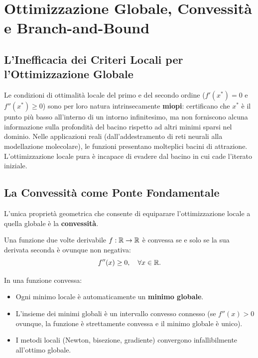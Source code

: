 \FloatBarrier
\section[Ottimizzazione Globale, Convessit\`a e Branch-and-Bound]{Ottimizzazione Globale, Convessit\`a\\e Branch-and-Bound}
\label{sec:univariata-global-branch-and-bound}

\subsection{L'Inefficacia dei Criteri Locali per l'Ottimizzazione Globale}
Le condizioni di ottimalit\`a locale del primo e del secondo ordine ($f'(x^*) = 0$ e $f''(x^*) \ge 0$) sono per loro natura intrinsecamente \textbf{miopi}: certificano che $x^*$ \`e il punto pi\`u basso all'interno di un intorno infinitesimo, ma non forniscono alcuna informazione sulla profondit\`a del bacino rispetto ad altri minimi sparsi nel dominio.
Nelle applicazioni reali (dall'addestramento di reti neurali alla modellazione molecolare), le funzioni presentano molteplici bacini di attrazione. L'ottimizzazione locale pura \`e incapace di evadere dal bacino in cui cade l'iterato iniziale.

\subsection{La Convessit\`a come Ponte Fondamentale}
L'unica propriet\`a geometrica che consente di equiparare l'ottimizzazione locale a quella globale \`e la \textbf{convessit\`a}.
\begin{definition}
Una funzione due volte derivabile $f: \mathbb{R} \to \mathbb{R}$ \`e convessa se e solo se la sua derivata seconda \`e ovunque non negativa:
\begin{equation}
    f''(x) \ge 0, \quad \forall x \in \mathbb{R}.
\end{equation}
\end{definition}
In una funzione convessa:
\begin{itemize}
    \item Ogni minimo locale \`e automaticamente un \textbf{minimo globale}.
    \item L'insieme dei minimi globali \`e un intervallo convesso connesso (se $f''(x) > 0$ ovunque, la funzione \`e strettamente convessa e il minimo globale \`e unico).
    \item I metodi locali (Newton, bisezione, gradiente) convergono infallibilmente all'ottimo globale.
\end{itemize}

